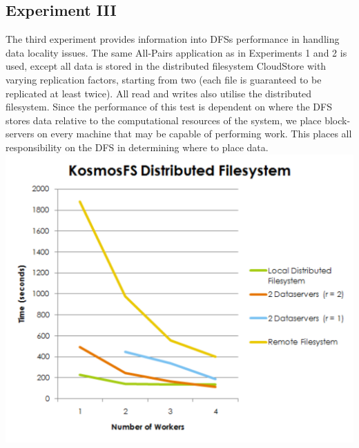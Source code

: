 \documentclass{rspublic}
\begin{document}
\subsection{Experiment III} The third experiment provides information
into DFSs performance in handling data locality issues. The same
All-Pairs application as in Experiments 1 and 2 is used, except all data
is stored in the distributed filesystem CloudStore with varying
replication factors, starting from two (each file is guaranteed to be
replicated at least twice). All read and writes also utilise the
distributed filesystem.  Since the performance of this test is dependent
on where the DFS stores data relative to the computational resources of
the system, we place block-servers on every machine that may be capable
of performing work.  This places all responsibility on the DFS in
determining where to place data.
\includegraphics[width=\textwidth]{KFSTest.pdf}
\end{document}
